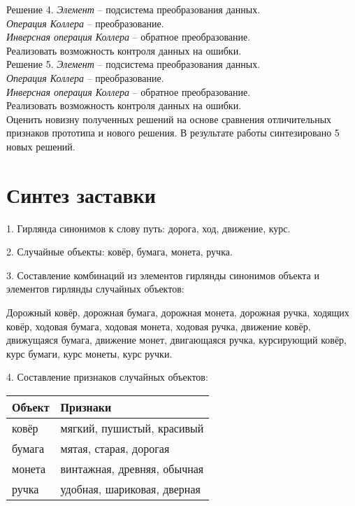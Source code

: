 Решение 4.
\emph{Элемент} -- подсистема преобразования данных.\\
\emph{Операция Коллера} -- преобразование.\\
\emph{Инверсная операция Коллера} -- обратное преобразование.\\
Реализовать возможность контроля данных на ошибки.\\

Решение 5.
\emph{Элемент} -- подсистема преобразования данных.\\
\emph{Операция Коллера} -- преобразование.\\
\emph{Инверсная операция Коллера} -- обратное преобразование.\\
Реализовать возможность контроля данных на ошибки.\\

Оценить новизну полученных решений на основе сравнения отличительных признаков прототипа и нового решения. 
В результате работы синтезировано 5 новых решений.

\chapter{Синтез заставки}
1. Гирлянда синонимов к слову путь: дорога, ход, движение, курс.

2. Случайные объекты: ковёр, бумага, монета, ручка.

3. Составление комбинаций из элементов гирлянды синонимов объекта и элементов гирлянды случайных объектов:

Дорожный ковёр, дорожная бумага, дорожная монета, дорожная ручка, ходящих ковёр, ходовая бумага, 
ходовая монета, ходовая ручка, движение ковёр, движущаяся бумага, движение монет, двигающаяся ручка, 
курсирующий ковёр, курс бумаги, курс монеты, курс ручки.

4. Составление признаков случайных объектов:
\begin{table}[h!]
    \center
    \begin{tabularx}{\textwidth}{|X|X|}
        \hline
        Объект & Признаки \\ \hline
        ковёр & мягкий, пушистый, красивый \\ \hline
        бумага & мятая, старая, дорогая \\ \hline
        монета & винтажная, древняя, обычная \\ \hline
        ручка & удобная, шариковая, дверная \\ \hline
    \end{tabularx}
\end{table}

